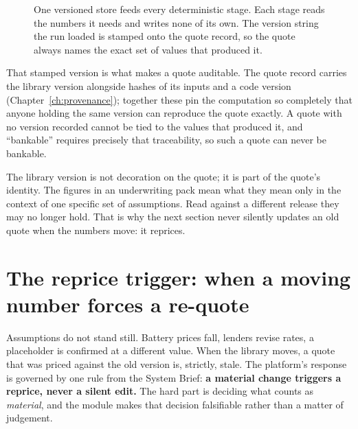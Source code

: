 \begin{figure}[H]
{}
\caption{One versioned store feeds every deterministic stage. Each stage reads the numbers it needs and writes none of its own. The version string the run loaded is stamped onto the quote record, so the quote always names the exact set of values that produced it.}
\label{fig:assumfeed}
\end{figure}

That stamped version is what makes a quote auditable. The quote record carries the library version alongside hashes of its inputs and a code version (Chapter~\ref{ch:provenance}); together these pin the computation so completely that anyone holding the same version can reproduce the quote exactly. A quote with no version recorded cannot be tied to the values that produced it, and ``bankable'' requires precisely that traceability, so such a quote can never be bankable.

\begin{keyidea}
The library version is not decoration on the quote; it is part of the quote's identity. The figures in an underwriting pack mean what they mean only in the context of one specific set of assumptions. Read against a different release they may no longer hold. That is why the next section never silently updates an old quote when the numbers move: it reprices.
\end{keyidea}

\section{The reprice trigger: when a moving number forces a re-quote}

Assumptions do not stand still. Battery prices fall, lenders revise rates, a placeholder is confirmed at a different value. When the library moves, a quote that was priced against the old version is, strictly, stale. The platform's response is governed by one rule from the System Brief: \textbf{a material change triggers a reprice, never a silent edit.} The hard part is deciding what counts as \emph{material}, and the module makes that decision falsifiable rather than a matter of judgement.

